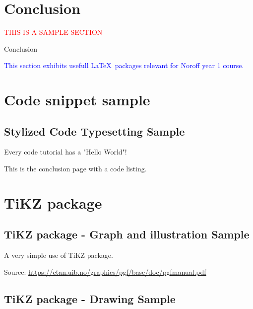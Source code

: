 \section{Conclusion}

{\begin{center}
    \textcolor{red}{\Huge{THIS IS A SAMPLE SECTION}}  %
\end{center}

Conclusion

{\textcolor{blue}{This section exhibits usefull \LaTeX\ packages relevant for Noroff year 1 course.}}

\section{Code snippet sample}

\subsection{Stylized Code Typesetting Sample}


Every code tutorial has a "Hello World"!


This is the conclusion page with a code listing.

\section{TiKZ package}

\subsection{TiKZ package - Graph and illustration Sample}

A very simple use of TiKZ package.


Source: \url{https://ctan.uib.no/graphics/pgf/base/doc/pgfmanual.pdf}

\subsection{TiKZ package - Drawing Sample}

}

